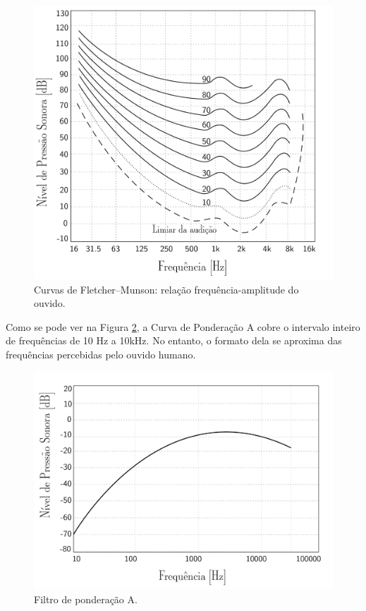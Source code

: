 \documentclass[
    12pt,               %
    openright,          %
    oneside,
    a4paper,            
    english,            %
    brazil              %
    ]{abntex2}
\begin{document}
\begin{figure}[!htb]
  \caption{\label{fletcher}Curvas de Fletcher–Munson: relação frequência-amplitude do ouvido.}
  \begin{center}
  \includegraphics[scale=0.33]{images/fletcher.pdf}
  \end{center}
\end{figure}

Como se pode ver na Figura \ref{a-weight}, a Curva de Ponderação A cobre o intervalo inteiro de frequências de 10 Hz a 10kHz. No entanto, o formato dela se aproxima das frequências percebidas pelo ouvido humano.

\begin{figure}[!htb]
  \caption{\label{a-weight}Filtro de ponderação A.}
  \begin{center}
  \includegraphics[scale=0.32]{images/a-weight.pdf}
  \end{center}
\end{figure}
\end{document}
